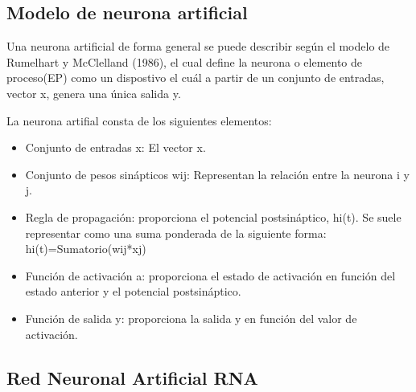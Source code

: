 \subsection{Modelo de neurona artificial}

Una neurona artificial de forma general se puede describir según el modelo de Rumelhart y McClelland (1986), el cual define la neurona o elemento de proceso(EP) como un dispostivo el cuál a partir de un conjunto de entradas, vector x, genera una única salida y.


La neurona artifial consta de los siguientes elementos:

\begin{itemize}
	\item{Conjunto de entradas x}: El vector x.
	\item{Conjunto de pesos sinápticos wij}: Representan la relación entre la neurona i y j.
	\item{Regla de propagación}: proporciona el potencial postsináptico, hi(t). Se suele representar como una suma ponderada de la siguiente forma:
	hi(t)=Sumatorio(wij*xj)
	\item{Función de activación a}: proporciona el estado de activación en función del estado anterior y el potencial postsináptico.
	\item{Función de salida y}: proporciona la salida y en función del valor de activación.
\end{itemize}

\subsection{Red Neuronal Artificial RNA}



























